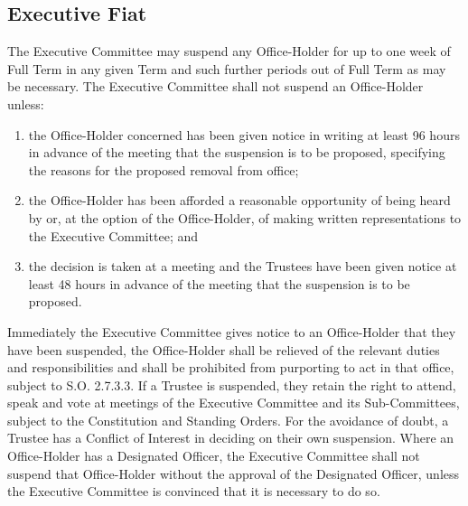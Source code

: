 \subsection{Executive Fiat}
\npara The Executive Committee may suspend any Office-Holder for up to one week of Full Term in any given Term and such further periods out of Full Term as may be necessary.  The Executive Committee shall not suspend an Office-Holder unless:
\begin{enumerate}
	\item the Office-Holder concerned has been given notice in writing at least 96 hours in advance of the meeting that the suspension is to be proposed, specifying the reasons for the proposed removal from office;
	\item the Office-Holder has been afforded a reasonable opportunity of being heard by or, at the option of the Office-Holder, of making written representations to the Executive Committee; and
	\item the decision is taken at a meeting and the Trustees have been given notice at least 48 hours in advance of the meeting that the suspension is to be proposed.
\end{enumerate}
\npara Immediately the Executive Committee gives notice to an Office-Holder that they have been suspended, the Office-Holder shall be relieved of the relevant duties and responsibilities and shall be prohibited from purporting to act in that office, subject to S.O. 2.7.3.3.
\npara If a Trustee is suspended, they retain the right to attend, speak and vote at meetings of the Executive Committee and its Sub-Committees, subject to the Constitution and Standing Orders.
\npara For the avoidance of doubt, a Trustee has a Conflict of Interest in deciding on their own suspension.
\npara Where an Office-Holder has a Designated Officer, the Executive Committee shall not suspend that Office-Holder without the approval of the Designated Officer, unless the Executive Committee is convinced that it is necessary to do so.